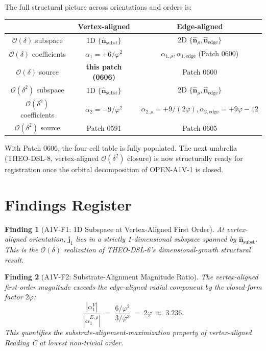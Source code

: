 \documentclass[11pt]{article}
\newtheorem{finding}{Finding}
\begin{document}
The full structural picture across orientations and orders is:
\begin{center}
\begin{tabular}{c|c|c}
\hline
 & Vertex-aligned & Edge-aligned \\
\hline
$\mathcal{O}(\delta)$ subspace & 1D $\{\hat{\mathbf{n}}_{\text{subst}}\}$
 & 2D $\{\hat{\mathbf{n}}_\rho, \hat{\mathbf{n}}_{\text{edge}}\}$ \\[2pt]
$\mathcal{O}(\delta)$ coefficients
 & $\alpha_1 = +6/\varphi^2$
 & $\alpha_{1,\rho}, \alpha_{1,\text{edge}}$ (Patch 0600) \\[2pt]
$\mathcal{O}(\delta)$ source
 & \textbf{this patch (0606)}
 & Patch 0600 \\
\hline
$\mathcal{O}(\delta^2)$ subspace & 1D $\{\hat{\mathbf{n}}_{\text{subst}}\}$
 & 2D $\{\hat{\mathbf{n}}_\rho, \hat{\mathbf{n}}_{\text{edge}}\}$ \\[2pt]
$\mathcal{O}(\delta^2)$ coefficients
 & $\alpha_2 = -9/\varphi^2$
 & $\alpha_{2,\rho} = +9/(2\varphi), \alpha_{2,\text{edge}} = +9\varphi - 12$
 \\[2pt]
$\mathcal{O}(\delta^2)$ source & Patch 0591 & Patch 0605 \\
\hline
\end{tabular}
\end{center}

\medskip
With Patch 0606, the four-cell table is fully populated. The next
umbrella (THEO-DSL-8, vertex-aligned $\mathcal{O}(\delta^2)$ closure) is
now structurally ready for registration once the orbital decomposition
of OPEN-A1V-1 is closed.

\section{Findings Register}

\begin{finding}[A1V-F1: 1D Subspace at Vertex-Aligned First Order]\label{find:A1V-F1}
At vertex-aligned orientation, $\mathbf{j}_1$ lies in a strictly
1-dimensional subspace spanned by $\hat{\mathbf{n}}_{\text{subst}}$.
This is the $\mathcal{O}(\delta)$ realization of THEO-DSL-6's
dimensional-growth structural result.
\end{finding}

\begin{finding}[A1V-F2: Substrate-Alignment Magnitude Ratio]\label{find:A1V-F2}
The vertex-aligned first-order magnitude exceeds the edge-aligned radial
component by the closed-form factor $2\varphi$:
\[
\frac{|\alpha_1^{V}|}{|\alpha_1^{E,\rho}|}
\;=\; \frac{6/\varphi^2}{3/\varphi^3} \;=\; 2\varphi \;\approx\; 3.236.
\]
This quantifies the substrate-alignment-maximization property of
vertex-aligned Reading C at lowest non-trivial order.
\end{finding}
\end{document}
